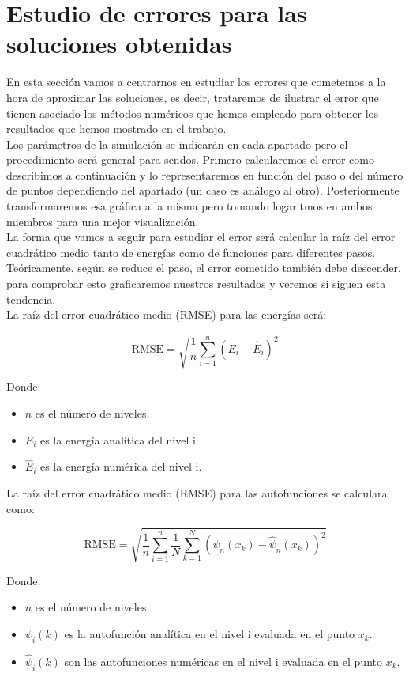 \documentclass[12pt]{article}
\begin{document}
\section{Estudio de errores para las soluciones obtenidas} \label{sec:errores}

En esta sección vamos a centrarnos en estudiar los errores que cometemos a la hora de aproximar las soluciones, es decir, trataremos de ilustrar el error que tienen asociado los métodos numéricos que hemos empleado para obtener los resultados que hemos mostrado en el trabajo.\\

Los parámetros de la simulación se indicarán en cada apartado pero el procedimiento será general para sendos. Primero calcularemos el error como describimos a continuación y lo representaremos en función del paso o del número de puntos dependiendo del apartado (un caso es análogo al otro). Posteriormente transformaremos esa gráfica a la misma pero tomando logaritmos en ambos miembros para una mejor visualización.\\ 

La forma que vamos a seguir para estudiar el error será calcular la raíz del error cuadrático medio tanto de energías como de funciones para diferentes pasos. Teóricamente, según se reduce el paso, el error cometido también debe descender, para comprobar esto graficaremos nuestros resultados y veremos si siguen esta tendencia. \\

La raíz del error cuadrático medio (RMSE) para las energías será:

\[
\text{RMSE} = \sqrt{\frac{1}{n} \sum_{i=1}^{n} (E_i - \hat{E}_i)^2}
\]

Donde:
\begin{itemize}
    \item \( n \) es el número de niveles.
    \item \( E_i \) es la energía analítica del nivel i.
    \item \( \hat{E}_i \) es la energía numérica del nivel i.
\end{itemize}

La raíz del error cuadrático medio (RMSE) para las autofunciones se calculara como:

\[
\text{RMSE} =\sqrt{\frac{1}{n}\sum_{i=1}^{n}\frac{1}{N} \sum_{k=1}^{N} (\psi_n(x_k) - \hat{\psi}_n(x_k))^2}
\]

Donde:
\begin{itemize}
    \item \( n \) es el número de niveles.
    \item \( \psi_i(k) \) es la autofunción analítica en el nivel i evaluada en el punto $x_k$.
    \item \( \hat{\psi}_i(k) \) son las autofunciones numéricas en el nivel i evaluada en el punto $x_k$.
\end{itemize}
\end{document}

